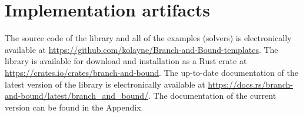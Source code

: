\section{Implementation artifacts}

The source code of the library and all of the examples (solvers) is electronically
available at \url{https://github.com/kolayne/Branch-and-Bound-templates}. The library
is available for download and installation as a Rust crate at
\url{https://crates.io/crates/branch-and-bound}.
The up-to-date documentation of the latest version of the library is electronically available
at \url{https://docs.rs/branch-and-bound/latest/branch_and_bound/}. The documentation of
the current version can be found in the Appendix.
